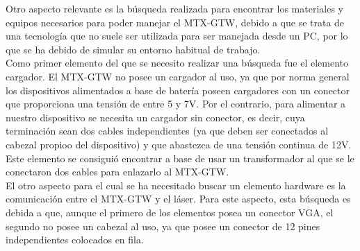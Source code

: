 Otro aspecto relevante es la búsqueda realizada para encontrar los materiales y equipos necesarios para poder manejar el MTX-GTW, debido a que se trata de una tecnología que no suele ser utilizada para ser manejada desde un PC, por lo que se ha debido de simular su entorno habitual de trabajo.\\

Como primer elemento del que se necesito realizar una búsqueda fue el elemento cargador. El MTX-GTW no posee un cargador al uso, ya que por norma general los dispositivos alimentados a base  de batería poseen cargadores con un conector que proporciona una tensión de entre 5 y 7V. Por el contrario, para alimentar a nuestro dispositivo se necesita un cargador sin conector, es decir, cuya terminación sean dos cables independientes (ya que deben ser conectados al cabezal propioo del dispositivo) y que abastezca de una tensión continua de 12V. Este elemento se consiguió encontrar a base de usar un transformador al que se le conectaron dos cables para enlazarlo al MTX-GTW.\\

El otro aspecto para el cual se ha necesitado buscar un elemento hardware es la comunicación entre el MTX-GTW y el láser. Para este aspecto, esta búsqueda es debida a que, aunque el primero de los elementos posea un conector VGA, el segundo no posee un cabezal al uso, ya que posee un conector de 12 pines independientes colocados en fila.